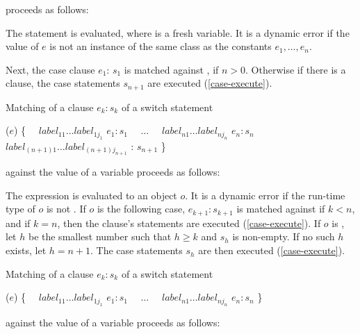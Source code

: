\documentclass[makeidx]{article}
\begin{document}
{proceeds as follows:

\LMHash{}%
The statement  is evaluated,
where \id{} is a fresh variable.
It is a dynamic error if the value of $e$ is
not an instance of the same class as the constants $e_1, \ldots, e_n$.


\LMHash{}%
Next, the case clause \CASE{} $e_{1}$: $s_{1}$ is matched against \id,
if $n > 0$.
Otherwise if there is a \DEFAULT{} clause,
the case statements $s_{n+1}$ are executed (\ref{case-execute}).

\LMHash{}%
Matching of a \CASE{} clause \CASE{} $e_{k}: s_{k}$ of a switch statement

\begin{normativeDartCode}
\SWITCH{} ($e$) \{
\ \ $label_{11} \ldots label_{1j_1}$ \CASE{} $e_1: s_1$
\ \ $\ldots$
\ \ $label_{n1} \ldots label_{nj_n}$ \CASE{} $e_n: s_n$
\ \ $label_{(n+1)1} \ldots label_{(n+1)j_{n+1}}$ \DEFAULT{}: $s_{n+1}$
\}
\end{normativeDartCode}

against the value of a variable \id{} proceeds as follows:

\LMHash{}%
The expression  is evaluated to an object $o$.
It is a dynamic error if the run-time type of $o$ is not .
If $o$ is \FALSE{} the following case,
\CASE{} $e_{k+1}: s_{k+1}$ is matched against \id{} if $k < n$,
and if $k = n$, then the \DEFAULT{} clause's statements are executed
(\ref{case-execute}).
If $o$ is \TRUE, let $h$ be the smallest number
such that $h \ge k$ and $s_h$ is non-empty.
If no such $h$ exists, let $h = n + 1$.
The case statements $s_h$ are then executed (\ref{case-execute}).

\LMHash{}%
Matching of a \CASE{} clause \CASE{} $e_{k}: s_{k}$ of a switch statement

\begin{normativeDartCode}
\SWITCH{} ($e$) \{
\ \ $label_{11} \ldots label_{1j_1}$ \CASE{} $e_1: s_1$
\ \ $\ldots$
\ \ $label_{n1} \ldots label_{nj_n}$ \CASE{} $e_n: s_n$
\}
\end{normativeDartCode}

against the value of a variable \id{} proceeds as follows:

}
\end{document}

